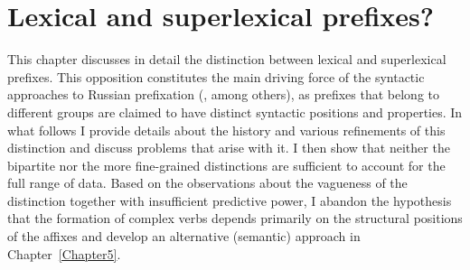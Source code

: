 
\chapter{Lexical and superlexical prefixes?} 
\label{Chapter4}

This chapter discusses in detail the distinction between lexical and superlexical prefixes. This opposition constitutes the main driving force of the syntactic approaches to Russian prefixation (\citealt{Ramchand:04, Svenonius:04b, Romanova:06}, among others), as prefixes that belong to different groups are claimed to have distinct syntactic positions and properties. In what follows I provide details about the history and various refinements of this distinction and discuss problems that arise with it. I then show that neither the bipartite nor the more fine-grained distinctions are sufficient to account for the full range of data. Based on the observations about the vagueness of the distinction together with insufficient predictive power, I abandon the hypothesis that the formation of complex verbs depends primarily on the structural positions of the affixes and develop an alternative (semantic) approach in Chapter~\ref{Chapter5}.

